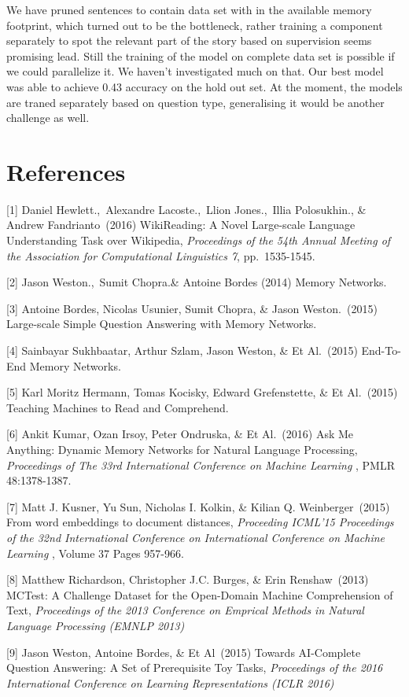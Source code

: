 \documentclass{article}
\begin{document}
We have pruned sentences to contain data set with in the available memory footprint, which turned out to be the bottleneck, rather training a component separately to spot the relevant part of the story based on supervision seems promising lead. Still the training of the model on complete data set is possible if we could parallelize it. We haven't investigated much on that. Our best model was able to achieve 0.43 accuracy on the hold out set. At the moment, the models are traned separately based on question type, generalising it would be another challenge as well.


\section*{References}
\medskip

\small

[1] Daniel Hewlett.,\ Alexandre Lacoste.,\  Llion Jones.,\ Illia Polosukhin., \& Andrew Fandrianto\ (2016) WikiReading: A Novel Large-scale Language Understanding Task over Wikipedia, {\it Proceedings of the 54th Annual Meeting of the Association for Computational Linguistics 7}, pp.\ 1535-1545.

[2] Jason Weston.,\ Sumit Chopra.\& Antoine Bordes (2014) Memory Networks.

[3] Antoine Bordes, Nicolas Usunier, Sumit Chopra, \&  Jason Weston.\ (2015) Large-scale Simple Question Answering with Memory Networks.

[4] Sainbayar Sukhbaatar, Arthur Szlam, Jason Weston, \&  Et Al.\ (2015) End-To-End Memory Networks.

[5] Karl Moritz Hermann, Tomas Kocisky, Edward Grefenstette, \&  Et Al.\ (2015) Teaching Machines to Read and Comprehend.

[6] Ankit Kumar, Ozan Irsoy, Peter Ondruska, \&  Et Al.\ (2016) Ask Me Anything: Dynamic Memory Networks for Natural Language Processing, {\it Proceedings of The 33rd International Conference on Machine Learning} , PMLR 48:1378-1387.

[7] Matt J. Kusner, Yu Sun, Nicholas I. Kolkin, \&   	Kilian Q. Weinberger\ (2015) From word embeddings to document distances, {\it Proceeding
ICML'15 Proceedings of the 32nd International Conference on International Conference on Machine Learning} , Volume 37 Pages 957-966.

[8] Matthew Richardson, Christopher J.C. Burges, \&   	Erin Renshaw\ (2013) MCTest: A Challenge Dataset for the Open-Domain Machine Comprehension of Text, {\it Proceedings of the 2013 Conference on Emprical Methods in Natural Language Processing (EMNLP 2013) }

[9] Jason Weston, Antoine Bordes, \&   	Et Al\ (2015) Towards AI-Complete Question Answering: A Set of Prerequisite Toy Tasks, {\it Proceedings of the 2016 International Conference on Learning Representations (ICLR 2016) }
\end{document}
